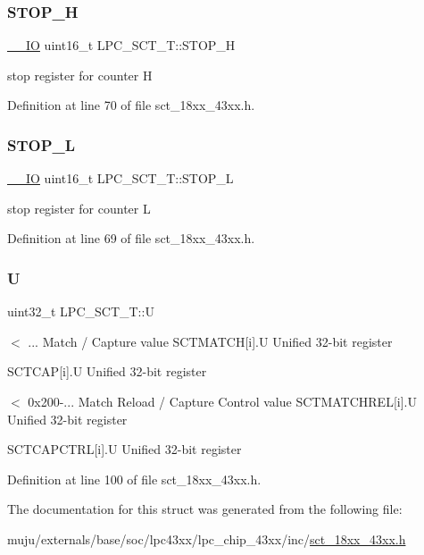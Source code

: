 \subsubsection{\texorpdfstring{S\+T\+O\+P\+\_\+H}{STOP\_H}}
{\footnotesize\ttfamily \hyperlink{core__sc300_8h_aec43007d9998a0a0e01faede4133d6be}{\+\_\+\+\_\+\+IO} uint16\+\_\+t L\+P\+C\+\_\+\+S\+C\+T\+\_\+\+T\+::\+S\+T\+O\+P\+\_\+H}

stop register for counter H 

Definition at line 70 of file sct\+\_\+18xx\+\_\+43xx.\+h.

\mbox{\label{struct_l_p_c___s_c_t___t_aa6b0b5b77a8fd56f98bec6aa95292fa6}} 
\subsubsection{\texorpdfstring{S\+T\+O\+P\+\_\+L}{STOP\_L}}
{\footnotesize\ttfamily \hyperlink{core__sc300_8h_aec43007d9998a0a0e01faede4133d6be}{\+\_\+\+\_\+\+IO} uint16\+\_\+t L\+P\+C\+\_\+\+S\+C\+T\+\_\+\+T\+::\+S\+T\+O\+P\+\_\+L}

stop register for counter L 

Definition at line 69 of file sct\+\_\+18xx\+\_\+43xx.\+h.

\mbox{\label{struct_l_p_c___s_c_t___t_a0be9245237cb05f7d9f5b1a9be51dfb0}} 
\subsubsection{\texorpdfstring{U}{U}}
{\footnotesize\ttfamily uint32\+\_\+t L\+P\+C\+\_\+\+S\+C\+T\+\_\+\+T\+::U}

$<$ ... Match / Capture value S\+C\+T\+M\+A\+T\+CH\mbox{[}i\mbox{]}.U Unified 32-\/bit register

S\+C\+T\+C\+AP\mbox{[}i\mbox{]}.U Unified 32-\/bit register

$<$ 0x200-\/... Match Reload / Capture Control value S\+C\+T\+M\+A\+T\+C\+H\+R\+EL\mbox{[}i\mbox{]}.U Unified 32-\/bit register

S\+C\+T\+C\+A\+P\+C\+T\+RL\mbox{[}i\mbox{]}.U Unified 32-\/bit register 

Definition at line 100 of file sct\+\_\+18xx\+\_\+43xx.\+h.



The documentation for this struct was generated from the following file\+:\begin{DoxyCompactItemize}
\item 
muju/externals/base/soc/lpc43xx/lpc\+\_\+chip\+\_\+43xx/inc/\hyperlink{sct__18xx__43xx_8h}{sct\+\_\+18xx\+\_\+43xx.\+h}\end{DoxyCompactItemize}
